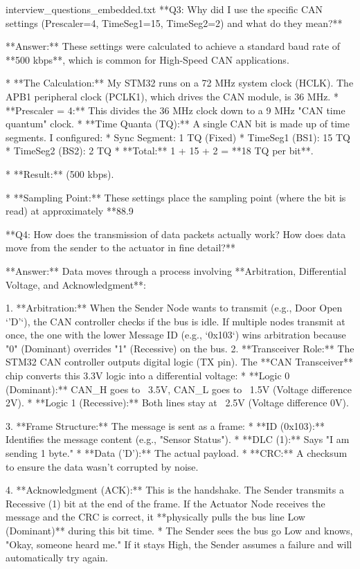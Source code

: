 \begin{filecontents*}{interview_questions_embedded.txt}
**Q3: Why did I use the specific CAN settings (Prescaler=4, TimeSeg1=15, TimeSeg2=2) and what do they mean?**

**Answer:**
These settings were calculated to achieve a standard baud rate of **500 kbps**, which is common for High-Speed CAN applications.

* **The Calculation:** My STM32 runs on a 72 MHz system clock (HCLK). The APB1 peripheral clock (PCLK1), which drives the CAN module, is 36 MHz.
* **Prescaler = 4:** This divides the 36 MHz clock down to a 9 MHz "CAN time quantum" clock.
* **Time Quanta (TQ):** A single CAN bit is made up of time segments. I configured:
* Sync Segment: 1 TQ (Fixed)
* TimeSeg1 (BS1): 15 TQ
* TimeSeg2 (BS2): 2 TQ
* **Total:** 1 + 15 + 2 = **18 TQ per bit**.


* **Result:**  (500 kbps).


* **Sampling Point:** These settings place the sampling point (where the bit is read) at approximately **88.9%

**Q4: How does the transmission of data packets actually work? How does data move from the sender to the actuator in fine detail?**

**Answer:**
Data moves through a process involving **Arbitration, Differential Voltage, and Acknowledgment**:

1. **Arbitration:** When the Sender Node wants to transmit (e.g., Door Open `'D'`), the CAN controller checks if the bus is idle. If multiple nodes transmit at once, the one with the lower Message ID (e.g., `0x103`) wins arbitration because "0" (Dominant) overrides "1" (Recessive) on the bus.
2. **Transceiver Role:** The STM32 CAN controller outputs digital logic (TX pin). The **CAN Transceiver** chip converts this 3.3V logic into a differential voltage:
* **Logic 0 (Dominant):** CAN_H goes to ~3.5V, CAN_L goes to ~1.5V (Voltage difference  2V).
* **Logic 1 (Recessive):** Both lines stay at ~2.5V (Voltage difference  0V).


3. **Frame Structure:** The message is sent as a frame:
* **ID (0x103):** Identifies the message content (e.g., "Sensor Status").
* **DLC (1):** Says "I am sending 1 byte."
* **Data ('D'):** The actual payload.
* **CRC:** A checksum to ensure the data wasn't corrupted by noise.


4. **Acknowledgment (ACK):** This is the handshake. The Sender transmits a Recessive (1) bit at the end of the frame. If the Actuator Node receives the message and the CRC is correct, it **physically pulls the bus line Low (Dominant)** during this bit time.
* The Sender sees the bus go Low and knows, "Okay, someone heard me." If it stays High, the Sender assumes a failure and will automatically try again.



\end{filecontents*}
